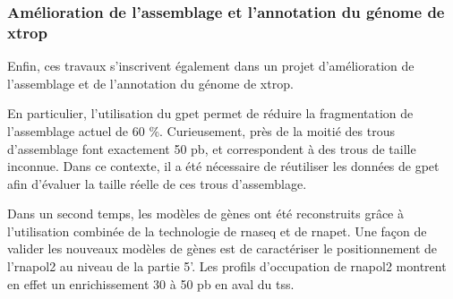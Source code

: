 \subsubsection{Amélioration de l'assemblage et l'annotation du génome de \gls{xtrop}}
Enfin, ces travaux s'inscrivent également dans un projet d'amélioration de l'assemblage et de l'annotation du génome de \gls{xtrop}.

En particulier, l'utilisation du \gls{gpet} permet de réduire la fragmentation de l'assemblage actuel de 60 \%.
Curieusement, près de la moitié des trous d'assemblage font exactement 50 \gls{pb}, et correspondent à des trous de taille inconnue.
Dans ce contexte, il a été nécessaire de réutiliser les données de \gls{gpet} afin d'évaluer la taille réelle de ces trous d'assemblage.

Dans un second temps, les modèles de gènes ont été reconstruits grâce à l'utilisation combinée de la technologie de \gls{rnaseq} et de \gls{rnapet}.
Une façon de valider les nouveaux modèles de gènes est de caractériser le positionnement de l'\gls{rnapol2} au niveau de la partie 5'.
Les profils d'occupation de \gls{rnapol2} montrent en effet un enrichissement 30 à 50 \gls{pb} en aval du \gls{tss}.


